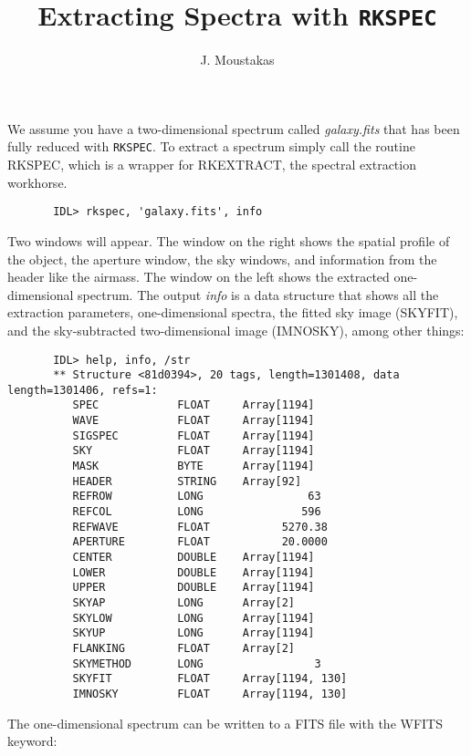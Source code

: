 \documentclass[12pt,preprint]{aastex}
\newcommand{\rk}{{\tt RKSPEC}}
\begin{document}
\pagestyle{plain}

\title{Extracting Spectra with \rk}
\author{J. Moustakas}

We assume you have a two-dimensional spectrum called
\emph{galaxy.fits} that has been fully reduced with \rk.  To extract a
spectrum simply call the routine RKSPEC, which is a wrapper for
RKEXTRACT, the spectral extraction workhorse.

\begin{verbatim}
       IDL> rkspec, 'galaxy.fits', info
\end{verbatim}

\noindent Two windows will appear.  The window on the right shows the
spatial profile of the object, the aperture window, the sky windows,
and information from the header like the airmass.  The window on the
left shows the extracted one-dimensional spectrum.  The output
\emph{info} is a data structure that shows all the extraction
parameters, one-dimensional spectra, the fitted sky image (SKYFIT),
and the sky-subtracted two-dimensional image (IMNOSKY), among other
things:

\begin{verbatim}
       IDL> help, info, /str
       ** Structure <81d0394>, 20 tags, length=1301408, data length=1301406, refs=1:
          SPEC            FLOAT     Array[1194]
          WAVE            FLOAT     Array[1194]
          SIGSPEC         FLOAT     Array[1194]
          SKY             FLOAT     Array[1194]
          MASK            BYTE      Array[1194]
          HEADER          STRING    Array[92]
          REFROW          LONG                63
          REFCOL          LONG               596
          REFWAVE         FLOAT           5270.38
          APERTURE        FLOAT           20.0000
          CENTER          DOUBLE    Array[1194]
          LOWER           DOUBLE    Array[1194]
          UPPER           DOUBLE    Array[1194]
          SKYAP           LONG      Array[2]
          SKYLOW          LONG      Array[1194]
          SKYUP           LONG      Array[1194]
          FLANKING        FLOAT     Array[2]
          SKYMETHOD       LONG                 3
          SKYFIT          FLOAT     Array[1194, 130]
          IMNOSKY         FLOAT     Array[1194, 130]
\end{verbatim}

\noindent The one-dimensional spectrum can be written to a FITS file
with the WFITS keyword:
\end{document}
